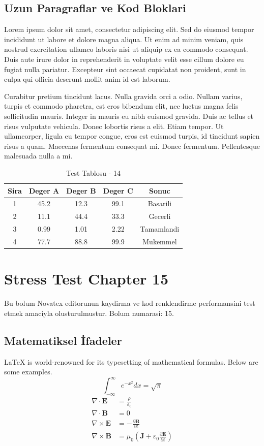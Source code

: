 \documentclass[12pt,a4paper]{article}
\begin{document}
\subsection{Uzun Paragraflar ve Kod Bloklari}
Lorem ipsum dolor sit amet, consectetur adipiscing elit. Sed do eiusmod tempor incididunt ut labore et dolore magna aliqua. Ut enim ad minim veniam, quis nostrud exercitation ullamco laboris nisi ut aliquip ex ea commodo consequat. Duis aute irure dolor in reprehenderit in voluptate velit esse cillum dolore eu fugiat nulla pariatur. Excepteur sint occaecat cupidatat non proident, sunt in culpa qui officia deserunt mollit anim id est laborum.

Curabitur pretium tincidunt lacus. Nulla gravida orci a odio. Nullam varius, turpis et commodo pharetra, est eros bibendum elit, nec luctus magna felis sollicitudin mauris. Integer in mauris eu nibh euismod gravida. Duis ac tellus et risus vulputate vehicula. Donec lobortis risus a elit. Etiam tempor. Ut ullamcorper, ligula eu tempor congue, eros est euismod turpis, id tincidunt sapien risus a quam. Maecenas fermentum consequat mi. Donec fermentum. Pellentesque malesuada nulla a mi.

\begin{table}[h!]
\centering
\begin{tabular}{|c|c|c|c|c|}
\hline
\textbf{Sira} & \textbf{Deger A} & \textbf{Deger B} & \textbf{Deger C} & \textbf{Sonuc} \\
\hline
1 & 45.2 & 12.3 & 99.1 & Basarili \\
2 & 11.1 & 44.4 & 33.3 & Gecerli \\
3 & 0.99 & 1.01 & 2.22 & Tamamlandi \\
4 & 77.7 & 88.8 & 99.9 & Mukemmel \\
\hline
\end{tabular}
\caption{Test Tablosu - 14}
\end{table}

\newpage
\section{Stress Test Chapter 15}
Bu bolum Novatex editorunun kaydirma ve kod renklendirme performansini test etmek amaciyla olusturulmustur. Bolum numarasi: 15.

\subsection{Matematiksel İfadeler}
\LaTeX{} is world-renowned for its typesetting of mathematical formulas. Below are some examples.
\begin{equation}
\int_{-\infty}^{\infty} e^{-x^2} dx = \sqrt{\pi}
\end{equation}
\begin{align}
\nabla \cdot \mathbf{E} &= \frac{\rho}{\varepsilon_0} \\
\nabla \cdot \mathbf{B} &= 0 \\
\nabla \times \mathbf{E} &= -\frac{\partial \mathbf{B}}{\partial t} \\
\nabla \times \mathbf{B} &= \mu_0\left(\mathbf{J} + \varepsilon_0 \frac{\partial \mathbf{E}}{\partial t}\right)
\end{align}
\end{document}
